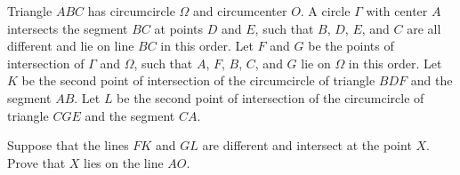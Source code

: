 Triangle $ABC$ has circumcircle $\Omega$ and circumcenter $O$. A circle $\Gamma$ with center $A$ intersects the segment $BC$ at points $D$ and $E$,  such that $B$,  $D$,  $E$,  and $C$ are all different and lie on line $BC$ in this order. Let $F$ and $G$ be the points of intersection of $\Gamma$ and $\Omega$,  such that $A$,  $F$,  $B$,  $C$,  and $G$ lie on $\Omega$ in this order. Let $K$ be the second point of intersection of the circumcircle of triangle $BDF$ and the segment $AB$. Let $L$ be the second point of intersection of the circumcircle of triangle $CGE$ and the segment $CA$.

Suppose that the lines $FK$ and $GL$ are different and intersect at the point $X$. Prove that $X$ lies on the line $AO$.